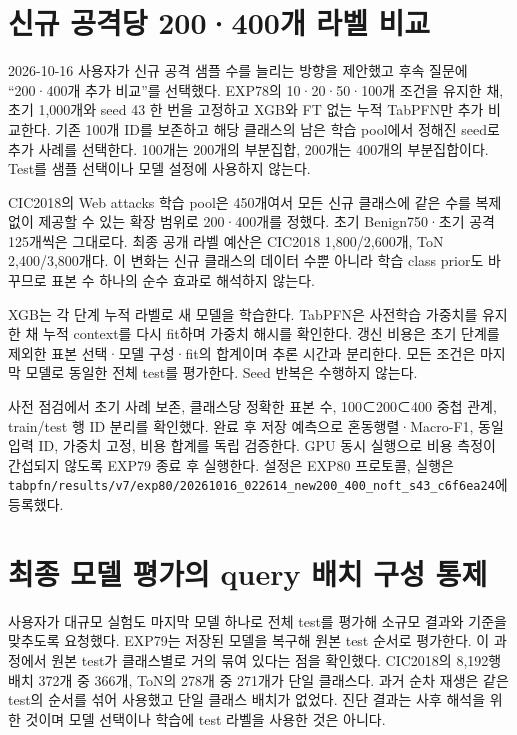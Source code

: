 \section{신규 공격당 200·400개 라벨 비교}
2026-10-16 사용자가 신규 공격 샘플 수를 늘리는 방향을 제안했고 후속 질문에 “200·400개 추가 비교”를 선택했다. EXP78의 10·20·50·100개 조건을 유지한 채, 초기 1,000개와 seed 43 한 번을 고정하고 XGB와 FT 없는 누적 TabPFN만 추가 비교한다. 기존 100개 ID를 보존하고 해당 클래스의 남은 학습 pool에서 정해진 seed로 추가 사례를 선택한다. 100개는 200개의 부분집합, 200개는 400개의 부분집합이다. Test를 샘플 선택이나 모델 설정에 사용하지 않는다.

CIC2018의 Web attacks 학습 pool은 450개여서 모든 신규 클래스에 같은 수를 복제 없이 제공할 수 있는 확장 범위로 200·400개를 정했다. 초기 Benign750·초기 공격125개씩은 그대로다. 최종 공개 라벨 예산은 CIC2018 1,800/\allowbreak{}2,600개, ToN 2,400/\allowbreak{}3,800개다. 이 변화는 신규 클래스의 데이터 수뿐 아니라 학습 class prior도 바꾸므로 표본 수 하나의 순수 효과로 해석하지 않는다.

XGB는 각 단계 누적 라벨로 새 모델을 학습한다. TabPFN은 사전학습 가중치를 유지한 채 누적 context를 다시 fit하며 가중치 해시를 확인한다. 갱신 비용은 초기 단계를 제외한 표본 선택·모델 구성·fit의 합계이며 추론 시간과 분리한다. 모든 조건은 마지막 모델로 동일한 전체 test를 평가한다. Seed 반복은 수행하지 않는다.

사전 점검에서 초기 사례 보존, 클래스당 정확한 표본 수, 100⊂200⊂400 중첩 관계, train/\allowbreak{}test 행 ID 분리를 확인했다. 완료 후 저장 예측으로 혼동행렬·Macro-F1, 동일 입력 ID, 가중치 고정, 비용 합계를 독립 검증한다. GPU 동시 실행으로 비용 측정이 간섭되지 않도록 EXP79 종료 후 실행한다. 설정은 EXP80 프로토콜, 실행은 \texttt{tabpfn/\allowbreak{}\allowbreak{}r\allowbreak{}esults/\allowbreak{}\allowbreak{}v\allowbreak{}7/\allowbreak{}\allowbreak{}exp80/\allowbreak{}\allowbreak{}20261016\allowbreak{}\_\allowbreak{}\allowbreak{}022614\_\allowbreak{}\allowbreak{}new200\_\allowbreak{}\allowbreak{}4\allowbreak{}00\_\allowbreak{}\allowbreak{}noft\_\allowbreak{}\allowbreak{}s43\_\allowbreak{}\allowbreak{}c6f6\allowbreak{}ea24}에 등록했다.



\section{최종 모델 평가의 query 배치 구성 통제}
사용자가 대규모 실험도 마지막 모델 하나로 전체 test를 평가해 소규모 결과와 기준을 맞추도록 요청했다. EXP79는 저장된 모델을 복구해 원본 test 순서로 평가한다. 이 과정에서 원본 test가 클래스별로 거의 묶여 있다는 점을 확인했다. CIC2018의 8,192행 배치 372개 중 366개, ToN의 278개 중 271개가 단일 클래스다. 과거 순차 재생은 같은 test의 순서를 섞어 사용했고 단일 클래스 배치가 없었다. 진단 결과는 사후 해석을 위한 것이며 모델 선택이나 학습에 test 라벨을 사용한 것은 아니다.

